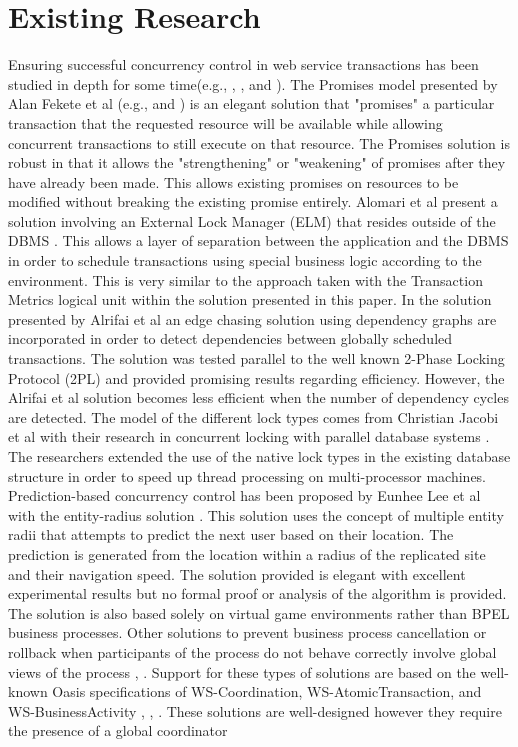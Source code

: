 \documentclass[conference]{IEEEtran}
\begin{document}
\section{Existing Research}
\label{sec:existing_research}
Ensuring successful concurrency control in web service transactions has been studied in depth for some time(e.g., \cite{Fekete_Promises}, \cite{Fekete_IsolationSupport}, and \cite{Alrifai_Distributed_Managment}). The Promises model presented by Alan Fekete et al (e.g., \cite{Fekete_Promises} and \cite{Fekete_IsolationSupport}) is an elegant solution that "promises" a particular transaction that the requested resource will be available while allowing concurrent transactions to still execute on that resource. The Promises solution is robust in that it allows the "strengthening" or "weakening" of promises after they have already been made. This allows existing promises on resources to be modified without breaking the existing promise entirely. Alomari et al present a solution involving an External Lock Manager (ELM) that resides outside of the DBMS \cite{Fekete_SnapshotIso}. This allows a layer of separation between the application and the DBMS in order to schedule transactions using special business logic according to the environment. This is very similar to the approach taken with the Transaction Metrics logical unit within the solution presented in this paper. In the solution presented by Alrifai et al \cite{Alrifai_Distributed_Managment} an edge chasing solution using dependency graphs are incorporated in order to detect dependencies between globally scheduled transactions. The solution was tested parallel to the well known 2-Phase Locking Protocol (2PL) and provided promising results regarding efficiency. However, the Alrifai et al solution becomes less efficient when the number of dependency cycles are detected. The model of the different lock types comes from Christian Jacobi et al with their research in concurrent locking with parallel database systems \cite{Jacobi_Locking}. The researchers extended the use of the native lock types in the existing database structure in order to speed up thread processing on multi-processor machines. Prediction-based concurrency control has been proposed by Eunhee Lee et al with the entity-radius solution \cite{Eunhee_PredictionBasedCC}. This solution uses the concept of multiple entity radii that attempts to predict the next user based on their location. The prediction is generated from the location within a radius of the replicated site and their navigation speed. The solution provided is elegant with excellent experimental results but no formal proof or analysis of the algorithm is provided. The solution is also based solely on virtual game environments rather than BPEL business processes. Other solutions to prevent business process cancellation or rollback when participants of the process do not behave correctly involve global views of the process \cite{Riegen_RuleBased}, \cite{Fekete_RAMP}. Support for these types of solutions are based on the well-known Oasis specifications of WS-Coordination, WS-AtomicTransaction, and WS-BusinessActivity \cite{WSCO}, \cite{WSAT}, \cite{WSBA}. These solutions are well-designed however they require the presence of a global coordinator 
\end{document}
